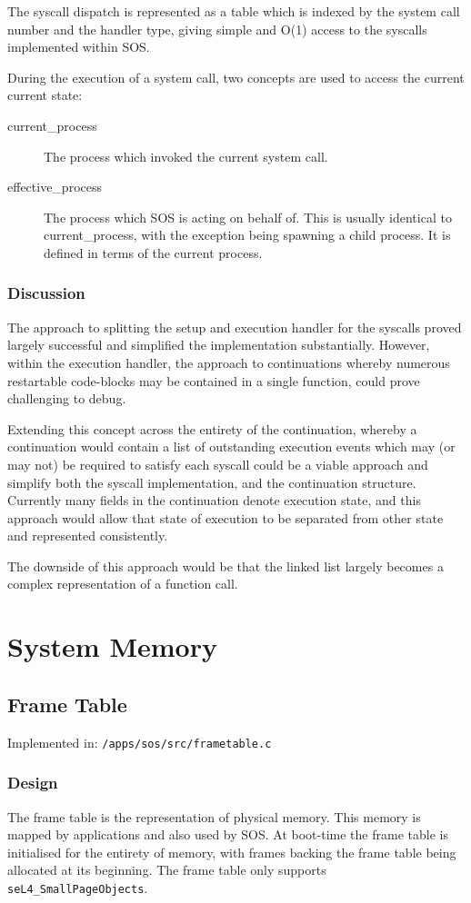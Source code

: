 \documentclass[a4paper,12pt]{article}
\begin{document}
The syscall dispatch is represented as a table which is indexed by the system
call number and the handler type, giving simple and O(1) access to
the syscalls implemented within SOS.

During the execution of a system call, two concepts are used to access the
current current state:
\begin{description}
\item[current\_process] The process which invoked the current system call.
\item[effective\_process] The process which SOS is acting on behalf of.  This
  is usually identical to current\_process, with the exception being spawning
  a child process.  It is defined in terms of the current process.
\end{description}

\subsubsection{Discussion}
The approach to splitting the setup and execution handler for the syscalls
proved largely successful and simplified the implementation substantially.  However,
within the execution handler, the approach to continuations whereby numerous
restartable code-blocks may be contained in a single function, could prove
challenging to debug.

Extending this concept across the entirety of the continuation, whereby a
continuation would contain a list of outstanding execution events which may
(or may not) be required to satisfy each syscall could be a viable approach
and simplify both the syscall implementation, and the continuation structure.
Currently many fields in the continuation denote execution state, and this
approach would allow that state of execution to be separated from other state
and represented consistently.

The downside of this approach would be that the linked list largely becomes a
complex representation of a function call.

\section{System Memory}
\subsection{Frame Table}
Implemented in: \texttt{/apps/sos/src/frametable.c}
\subsubsection{Design}
The frame table is the representation of physical memory. This memory is
mapped by applications and also used by SOS.  At boot-time the frame table is
initialised for the entirety of memory, with frames backing the frame table
being allocated at its beginning.  The frame table only supports
\texttt{seL4\_SmallPageObjects}.
\end{document}
